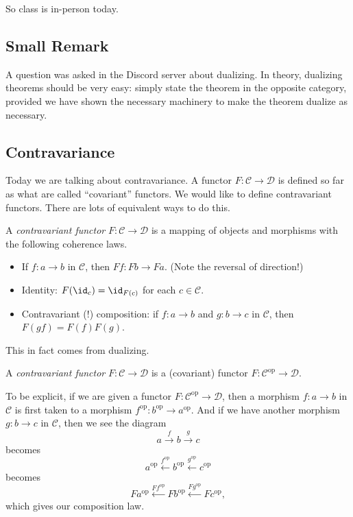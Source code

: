 
So class is in-person today.

\subsection{Small Remark}
A question was asked in the Discord server about dualizing. In theory, dualizing theorems should be very easy: simply state the theorem in the opposite category, provided we have shown the necessary machinery to make the theorem dualize as necessary.

\subsection{Contravariance}
Today we are talking about contravariance. A functor $F:\mathcal C\to\mathcal D$ is defined so far as what are called ``covariant'' functors. We would like to define contravariant functors. There are lots of equivalent ways to do this.
\begin{definition}[Contravariance, I]
	A \textit{contravariant functor} $F:\mathcal C\to\mathcal D$ is a mapping of objects and morphisms with the following coherence laws.
	\begin{itemize}
		\item If $f:a\to b$ in $\mathcal C$, then $Ff:Fb\to Fa$. (Note the reversal of direction!)
		\item Identity: $F(\id_c)=\id_{F(c)}$ for each $c\in\mathcal C$.
		\item Contravariant (!) composition: if $f:a\to b$ and $g:b\to c$ in $\mathcal C$, then $F(gf)=F(f)F(g)$.
	\end{itemize}
\end{definition}
This in fact comes from dualizing.
\begin{definition}[Contravariance, II] \label{def:contra}
	A \textit{contravariant functor} $F:\mathcal C\to\mathcal D$ is a (covariant) functor $F:\mathcal C^\mathrm{op}\to\mathcal D$.
\end{definition}
To be explicit, if we are given a functor $F:\mathcal C^\mathrm{op}\to\mathcal D$, then a morphism $f:a\to b$ in $\mathcal C$ is first taken to a morphism $f^\mathrm{op}:b^\mathrm{op}\to a^\mathrm{op}$. And if we have another morphism $g:b\to c$ in $\mathcal C$, then we see the diagram
\[a\stackrel f\to b\stackrel g\to c\]
becomes
\[a^\mathrm{op}\stackrel{f^\mathrm{op}}\leftarrow b^\mathrm{op}\stackrel{g^\mathrm{op}}\leftarrow c^\mathrm{op}\]
becomes
\[Fa^\mathrm{op}\stackrel{Ff^\mathrm{op}}\leftarrow Fb^\mathrm{op}\stackrel{Fg^\mathrm{op}}\leftarrow Fc^\mathrm{op},\]
which gives our composition law.

